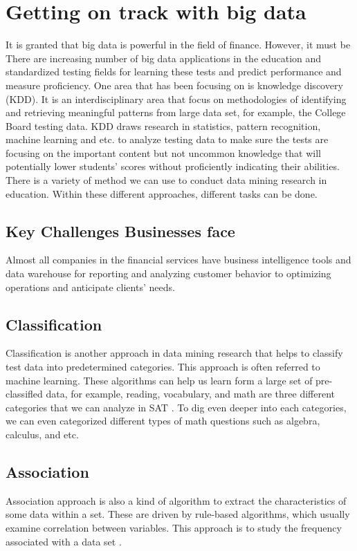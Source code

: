 \documentclass[sigconf]{acmart}
\begin{document}
\section{Getting on track with big data}
It is granted that big data is powerful in the field of finance. However, it must be There are increasing number of big data applications in the education and standardized testing fields for learning these tests and predict performance and measure proficiency. One area that has been focusing on is knowledge discovery (KDD). It is an interdisciplinary area that focus on methodologies of identifying and retrieving meaningful patterns from large data set, for example, the College Board  testing data. KDD draws research in statistics, pattern recognition, machine learning and etc. to analyze testing data to make sure the tests are focusing on the important content but not uncommon knowledge that will potentially lower students' scores without proficiently indicating their abilities\cite {Daniel2015}. There is a variety of method we can use to conduct data mining research in education. Within these different approaches, different tasks can be done.

\subsection{Key Challenges Businesses face}
Almost all companies in the financial services have business intelligence tools and data warehouse for reporting and analyzing customer behavior to optimizing operations and anticipate clients' needs.

\subsection{Classification}
Classification is another approach in data mining research that helps to classify test data into predetermined categories. This approach is often referred to machine learning. These algorithms can help us learn form a large set of pre-classifled data, for example, reading, vocabulary, and math are three different categories that we can analyze in SAT \cite {Daniel2015}. To dig even deeper into each categories, we can even categorized different types of math questions such as algebra, calculus, and etc. 

\subsection{Association}
Association approach is also a kind of algorithm to extract the characteristics of some data within a set. These are driven by rule-based algorithms, which usually examine correlation between variables. This approach is to study the frequency associated with a data set \cite {Daniel2015}.
\end{document}
